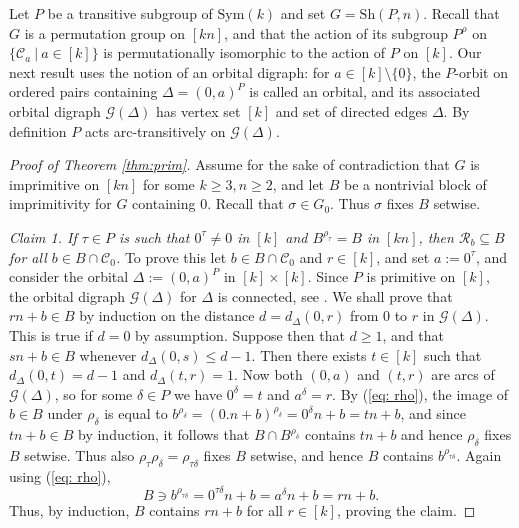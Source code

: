 \documentclass[12pt]{amsart}
\theoremstyle{remark}
\theoremstyle{definition}
\newcounter{claim}[thm]
\newcommand{\sym}{\mathrm{Sym}}
\newcommand{\sh}{\mathrm{Sh}}
\begin{document}
Let $P$ be a transitive subgroup of $\sym(k)$ and set $G = \sh(P,n)$. Recall that $G$ is a permutation group on $  [kn]$, and that the action of its subgroup $P^\rho$ on $\{ \mathcal{C}_a \ | \ a\in [k] \}$ is permutationally isomorphic to the action of $P$ on $[k]$. 
Our next result uses the notion of an orbital digraph: for $a \in [k] \setminus\{0\}$, the $P$-orbit on ordered pairs containing $\Delta = (0,a)^P$ is called an orbital, and its associated orbital digraph $\mathcal{G}(\Delta)$ has vertex set $[k]$ and set of directed edges $\Delta$. By definition $P$ acts arc-transitively on $\mathcal{G}(\Delta)$.

\begin{proof}[Proof of Theorem \ref{thm:prim}]
Assume for the sake of contradiction that $G$ is imprimitive on $[kn]$ for some $k\geqslant3, n\geqslant2$, and let $B$ be a nontrivial block of imprimitivity for $G$ containing $0$.  Recall that $\sigma \in G_0$. Thus $\sigma$ fixes $B$ setwise.

\medskip\noindent
\emph{Claim 1. If $\tau \in P$ is such that $0^\tau \ne 0$ in $[k]$ and $B^{\rho_\tau} = B$ in $[kn]$, then $\mathcal{R}_b \subseteq B$ for all $b \in B \cap \mathcal{C}_0$.} \quad To prove this let $b \in B \cap \mathcal{C}_0$ and $r \in [k]$, and set $a := 0^\tau$, and consider the orbital $\Delta := (0,a)^P$ in $[k]\times [k]$. Since $P$ is primitive on $[k]$, the orbital digraph $\mathcal{G}(\Delta)$ for $\Delta$ is connected, see \cite[Theorem 3.2A]{dixmort}. We shall prove that $rn + b \in B$ by induction on the distance $d = d_\Delta(0,r)$ from $0$ to $r$ in $\mathcal{G}(\Delta)$. This is true if $d = 0$ by assumption. Suppose then that $d \geqslant 1$, and that $sn + b \in B$ whenever $d_\Delta(0,s) \leqslant d-1$. Then there exists $t \in [k]$ such that $d_\Delta(0, t) = d-1$ and $d_\Delta(t, r) = 1$. Now  both $(0,a)$ and $(t,r)$ are arcs of $\mathcal{G}(\Delta)$, so for some $\delta \in P$ we have $0^\delta = t$ and $a^\delta = r$. By (\ref{eq: rho}), the image of $b \in B$ under $\rho_\delta$ is equal to $b^{\rho_\delta} = (0.n+b)^{\rho_\delta} = 0^\delta n + b = tn + b$, and since $tn + b \in B$ by induction, it follows that $B \cap B^{\rho_\delta}$ contains $tn + b$ and hence $\rho_\delta$ fixes $B$ setwise. Thus also $\rho_\tau\rho_\delta = \rho_{\tau\delta}$ fixes $B$ setwise, and hence $B$ contains $b^{\rho_{\tau\delta}}$. Again using (\ref{eq: rho}), 
	\[ B \ni b^{\rho_{\tau\delta}} = 0^{\tau\delta} n + b = a^\delta n + b = rn + b. \]
Thus, by induction, $B$ contains $rn+b$ for all $r \in [k]$, proving the claim.
  	

\end{proof}
\end{document}
